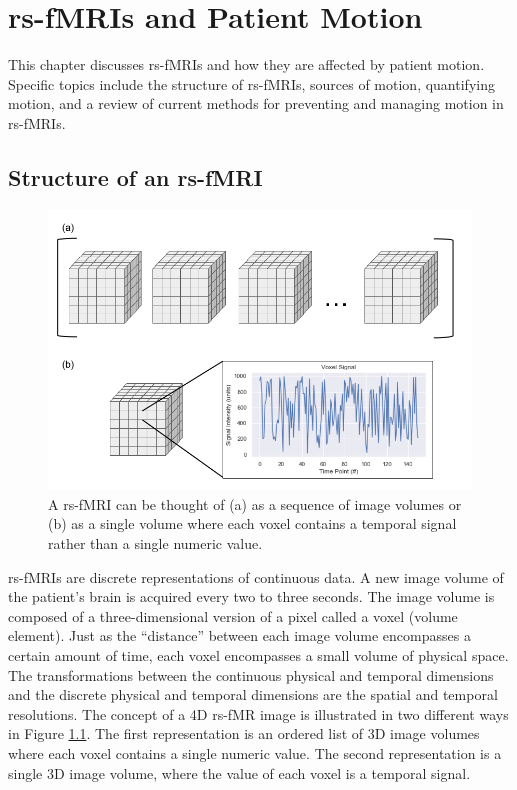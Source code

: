 \chapter{rs-fMRIs and Patient Motion}
\label{ch:mri}

This chapter discusses rs-fMRIs and how they are affected by patient motion. Specific topics include the structure of rs-fMRIs, sources of motion, quantifying motion, and a review of current methods for preventing and managing motion in rs-fMRIs.

\section{Structure of an rs-fMRI}

\begin{figure}
\centering
\includegraphics[width=.75\textwidth]{2/rsfMRI-views.png}
\caption{A rs-fMRI can be thought of (a) as a sequence of image volumes or (b) as a single volume where each voxel contains a temporal signal rather than a single numeric value.}
\label{ch2:fig:rsfmri-views}
\end{figure}


rs-fMRIs are discrete representations of continuous data. A new image volume of the patient's brain is acquired every two to three seconds. The image volume is composed of a three-dimensional version of a pixel called a voxel (volume element). Just as the ``distance'' between each image volume encompasses a certain amount of time, each voxel encompasses a small volume of physical space. The transformations between the continuous physical and temporal dimensions and the discrete physical and temporal dimensions are the spatial and temporal resolutions. 
The concept of a 4D rs-fMR image is illustrated in two different ways in Figure \ref{ch2:fig:rsfmri-views}. The first representation is an ordered list of 3D image volumes where each voxel contains a single numeric value. The second representation is a single 3D image volume, where the value of each voxel is a temporal signal.

